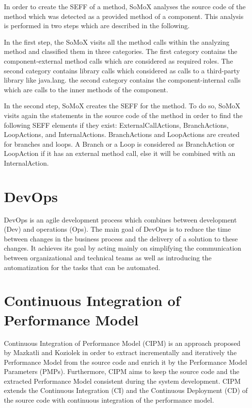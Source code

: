 In order to create the SEFF of a method, SoMoX analyses the source code of the method which was detected as a provided method of a component. This analysis is performed in two steps which are described in the following.

In the first step, the SoMoX visits all the method calls within the analyzing method and classified them in three categories. The first category contains the component-external method calls which are considered as required roles. The second category contains library calls which considered as calls to a third-party library like java.lang. the second category contains the component-internal calls which are calls to the inner methods of the component. 

In the second step, SoMoX creates the SEFF for the method.  To do so, SoMoX visits again the statements in the source code of the method in order to find the following SEFF elements if they exist: ExternalCallActions, BranchActions, LoopActions, and InternalActions. BranchActions and LoopActions are created for branches and loops. A Branch or a Loop is considered as BranchAction or LoopAction if it has an external method call, else it will be combined with an InternalAction.

\section{DevOps}
\label{sec:DevOps}
DevOps \cite{brunnert2015performance} is an agile development process which combines between development (Dev) and operations (Ops). The main goal of DevOps is to reduce the time between changes in the business process and the delivery of a solution to these changes. It achieves its goal by acting mainly on simplifying the communication between organizational and technical teams as well as introducing the automatization for the tasks that can be automated. 

\section{Continuous Integration of Performance Model}
\label{sec:Continuous Integration of Performance Model}
Continuous Integration of Performance Model (CIPM) is an approach proposed by Mazkatli and Koziolek \cite{mazkatli2018continuous} in order to extract incrementally and iteratively the Performance Model from the source code and enrich it by the Performance Model Parameters (PMPs). Furthermore, CIPM aims to keep the source code and the extracted Performance Model consistent during the system development. CIPM extends the Continuous Integration (CI) and the Continuous Deployment (CD) of the source code with continuous integration of the performance model. 

